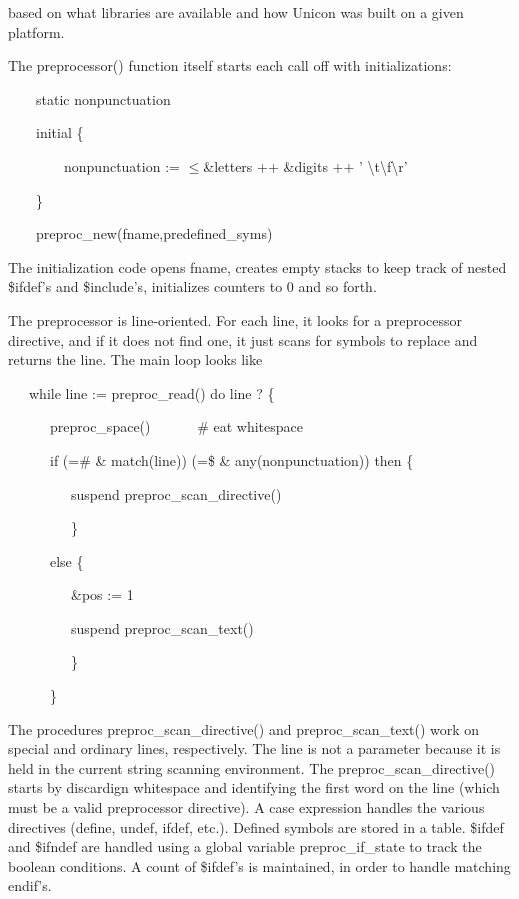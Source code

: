 \noindent based on what libraries are available and how Unicon was
built on a given platform.

The preprocessor() function itself starts each call off with initializations: 

{\ttfamily\mdseries
\ \ \ \ static nonpunctuation}

{\ttfamily\mdseries
\ \ \ \ initial \{}

{\ttfamily\mdseries
\ \ \ \ \ \ \ \ nonpunctuation := ${\leq}$\&letters ++ \&digits ++ '
{\textbackslash}t{\textbackslash}f{\textbackslash}r'}

{\ttfamily\mdseries
\ \ \ \ \}}


\bigskip

{\ttfamily\mdseries
\ \ \ \ preproc\_new(fname,predefined\_syms)}

The initialization code opens fname, creates empty stacks to keep
track of nested \$ifdef's and \$include's, initializes counters to 0
and so forth.

The preprocessor is line-oriented. For each line, it looks for a
preprocessor directive, and if it does not find one, it just scans for
symbols to replace and returns the line. The main loop looks like

{\ttfamily\mdseries
\ \ \ while line := preproc\_read() do line ? \{}

{\ttfamily\mdseries
\ \ \ \ \ \ preproc\_space() \ \ \ \ \ \ \# eat whitespace}

{\ttfamily\mdseries
\ \ \ \ \ \ if (={\textquotedbl}\#{\textquotedbl} \& match({\textquotedbl}line{\textquotedbl})) {\textbar}
(={\textquotedbl}\${\textquotedbl} \& any(nonpunctuation)) then \{}

{\ttfamily\mdseries
\ \ \ \ \ \ \ \ \ suspend preproc\_scan\_directive()}

{\ttfamily\mdseries
\ \ \ \ \ \ \ \ \ \}}

{\ttfamily\mdseries
\ \ \ \ \ \ else \{}

{\ttfamily\mdseries
\ \ \ \ \ \ \ \ \ \&pos := 1}

{\ttfamily\mdseries
\ \ \ \ \ \ \ \ \ suspend preproc\_scan\_text()}

{\ttfamily\mdseries
\ \ \ \ \ \ \ \ \ \}}

{\ttfamily\mdseries
\ \ \ \ \ \ \}}


The procedures preproc\_scan\_directive() and preproc\_scan\_text()
work on special and ordinary lines, respectively.  The line is not a
parameter because it is held in the current string scanning
environment. The preproc\_scan\_directive() starts by discardign
whitespace and identifying the first word on the line (which must be a
valid preprocessor directive). A case expression handles the various
directives (define, undef, ifdef, etc.). Defined symbols are stored in
a table. \$ifdef and \$ifndef are handled using a global variable
preproc\_if\_state to track the boolean conditions. A count of
\$ifdef's is maintained, in order to handle matching endif's.

